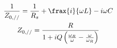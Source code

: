 \begin{equation}
    \begin{gathered}
    \frac{1}{Z_{0,//}} = \frac{1}{R_s} + \frax{i}{\omega L} - i\omega C	\\

	Z_{0,//} = \frac{R}{1+ iQ\left(\frac{\omega_R}{\omega} - \frac{\omega}{\omega_R}\right)}
    \end{gathered}
\end{equation}
